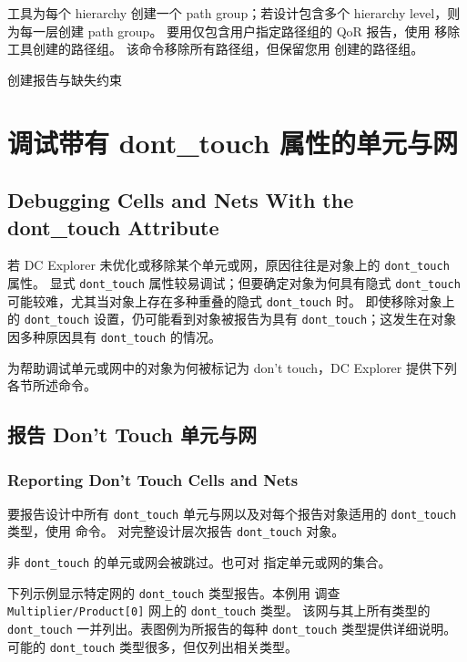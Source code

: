 工具为每个 hierarchy 创建一个 path group；若设计包含多个 hierarchy level，则为每一层创建 path group。
要用仅包含用户指定路径组的 QoR 报告，使用  移除工具创建的路径组。
该命令移除所有路径组，但保留您用  创建的路径组。

\begin{seeAlsoBox}
创建报告与缺失约束
\end{seeAlsoBox}

\section{调试带有 dont\_touch 属性的单元与网}
\subsection*{Debugging Cells and Nets With the dont\_touch Attribute}

若 DC Explorer 未优化或移除某个单元或网，原因往往是对象上的 \texttt{dont\_touch} 属性。
显式 \texttt{dont\_touch} 属性较易调试；但要确定对象为何具有隐式 \texttt{dont\_touch} 可能较难，尤其当对象上存在多种重叠的隐式 \texttt{dont\_touch} 时。
即使移除对象上的 \texttt{dont\_touch} 设置，仍可能看到对象被报告为具有 \texttt{dont\_touch}；这发生在对象因多种原因具有 \texttt{dont\_touch} 的情况。

为帮助调试单元或网中的对象为何被标记为 don't touch，DC Explorer 提供下列各节所述命令。

\subsection{报告 Don't Touch 单元与网}
\subsubsection*{Reporting Don't Touch Cells and Nets}

要报告设计中所有 \texttt{dont\_touch} 单元与网以及对每个报告对象适用的 \texttt{dont\_touch} 类型，使用  命令。
对完整设计层次报告 \texttt{dont\_touch} 对象。

非 \texttt{dont\_touch} 的单元或网会被跳过。也可对  指定单元或网的集合。

下列示例显示特定网的 \texttt{dont\_touch} 类型报告。本例用  调查 \texttt{Multiplier/Product[0]} 网上的 \texttt{dont\_touch} 类型。
该网与其上所有类型的 \texttt{dont\_touch} 一并列出。表图例为所报告的每种 \texttt{dont\_touch} 类型提供详细说明。可能的 \texttt{dont\_touch} 类型很多，但仅列出相关类型。

